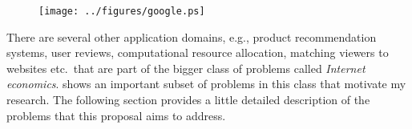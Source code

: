 \documentclass[10pt,psfig,letter]{article}
\begin{document}
\begin{figure}[h!]
\centering
 \texttt{[image: ../figures/google.ps]}
\end{figure}

There are several other application domains, e.g., product recommendation systems, user reviews, computational resource allocation, matching viewers to websites etc.\ that are part of the bigger class of problems called {\em Internet economics}.  shows an important subset of problems in this class that motivate my research. The following section provides a little detailed description of the problems that this proposal aims to address.
\end{document}
